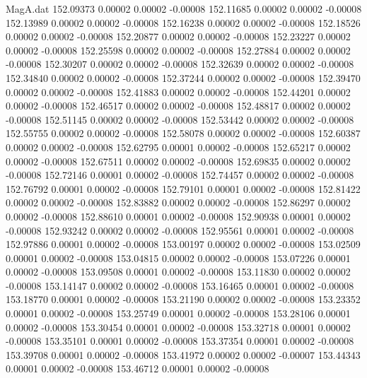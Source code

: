 \begin{filecontents}{MagA.dat}
 152.09373    0.00002    0.00002   -0.00008
 152.11685    0.00002    0.00002   -0.00008
 152.13989    0.00002    0.00002   -0.00008
 152.16238    0.00002    0.00002   -0.00008
 152.18526    0.00002    0.00002   -0.00008
 152.20877    0.00002    0.00002   -0.00008
 152.23227    0.00002    0.00002   -0.00008
 152.25598    0.00002    0.00002   -0.00008
 152.27884    0.00002    0.00002   -0.00008
 152.30207    0.00002    0.00002   -0.00008
 152.32639    0.00002    0.00002   -0.00008
 152.34840    0.00002    0.00002   -0.00008
 152.37244    0.00002    0.00002   -0.00008
 152.39470    0.00002    0.00002   -0.00008
 152.41883    0.00002    0.00002   -0.00008
 152.44201    0.00002    0.00002   -0.00008
 152.46517    0.00002    0.00002   -0.00008
 152.48817    0.00002    0.00002   -0.00008
 152.51145    0.00002    0.00002   -0.00008
 152.53442    0.00002    0.00002   -0.00008
 152.55755    0.00002    0.00002   -0.00008
 152.58078    0.00002    0.00002   -0.00008
 152.60387    0.00002    0.00002   -0.00008
 152.62795    0.00001    0.00002   -0.00008
 152.65217    0.00002    0.00002   -0.00008
 152.67511    0.00002    0.00002   -0.00008
 152.69835    0.00002    0.00002   -0.00008
 152.72146    0.00001    0.00002   -0.00008
 152.74457    0.00002    0.00002   -0.00008
 152.76792    0.00001    0.00002   -0.00008
 152.79101    0.00001    0.00002   -0.00008
 152.81422    0.00002    0.00002   -0.00008
 152.83882    0.00002    0.00002   -0.00008
 152.86297    0.00002    0.00002   -0.00008
 152.88610    0.00001    0.00002   -0.00008
 152.90938    0.00001    0.00002   -0.00008
 152.93242    0.00002    0.00002   -0.00008
 152.95561    0.00001    0.00002   -0.00008
 152.97886    0.00001    0.00002   -0.00008
 153.00197    0.00002    0.00002   -0.00008
 153.02509    0.00001    0.00002   -0.00008
 153.04815    0.00002    0.00002   -0.00008
 153.07226    0.00001    0.00002   -0.00008
 153.09508    0.00001    0.00002   -0.00008
 153.11830    0.00002    0.00002   -0.00008
 153.14147    0.00002    0.00002   -0.00008
 153.16465    0.00001    0.00002   -0.00008
 153.18770    0.00001    0.00002   -0.00008
 153.21190    0.00002    0.00002   -0.00008
 153.23352    0.00001    0.00002   -0.00008
 153.25749    0.00001    0.00002   -0.00008
 153.28106    0.00001    0.00002   -0.00008
 153.30454    0.00001    0.00002   -0.00008
 153.32718    0.00001    0.00002   -0.00008
 153.35101    0.00001    0.00002   -0.00008
 153.37354    0.00001    0.00002   -0.00008
 153.39708    0.00001    0.00002   -0.00008
 153.41972    0.00002    0.00002   -0.00007
 153.44343    0.00001    0.00002   -0.00008
 153.46712    0.00001    0.00002   -0.00008

\end{filecontents}
